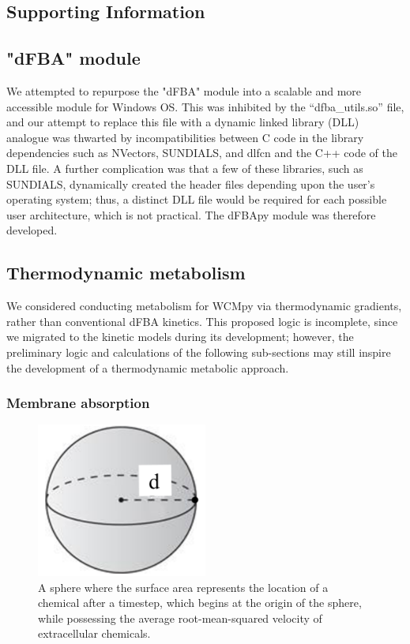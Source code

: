 
\begin{supplementary}

\section{Supporting Information}

\subsection{"dFBA" module}
We attempted to repurpose the "dFBA" module into a scalable and more accessible module for Windows OS. This was inhibited by the “dfba\_utils.so” file, and our attempt to replace this file with a dynamic linked library (DLL) analogue was thwarted by incompatibilities between C code in the library dependencies such as NVectors, SUNDIALS, and dlfcn and the C++ code of the DLL file. A further complication was that a few of these libraries, such as SUNDIALS, dynamically created the header files depending upon the user’s operating system; thus, a distinct DLL file would be required for each possible user architecture, which is not practical. The dFBApy module was therefore developed. 

\subsection{Thermodynamic metabolism}
We considered conducting metabolism for WCMpy via thermodynamic gradients, rather than conventional dFBA kinetics. This proposed logic is incomplete, since we migrated to the kinetic models during its development; however, the preliminary logic and calculations of the following sub-sections may still inspire the development of a thermodynamic metabolic approach.  

\subsubsection{Membrane absorption}

\begin{figure}
    \centering
    \includegraphics[width = 0.5\textwidth]{images/WCMpy/diffusion_sphere.png}
    \caption{
        A sphere where the surface area represents the location of a chemical after a timestep, which begins at the origin of the sphere, while possessing the average root-mean-squared velocity of extracellular chemicals.
    }
    \label{diffusion_sphere}
\end{figure}


\end{supplementary}
